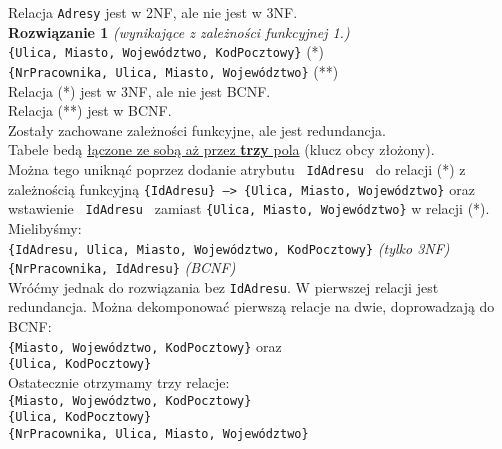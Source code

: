Relacja \texttt{Adresy} jest w 2NF, ale nie jest w 3NF.\\

\textbf{Rozwiązanie 1} \textit{(wynikające z zależności funkcyjnej 1.)}\\

\texttt{\{{\color{green}\faKey}{\color{blue}\faKey}Ulica,
{\color{green}\faKey}Miasto, {\color{green}\faKey}Województwo,
{\color{blue}\faKey}KodPocztowy\}} (*)\\
\texttt{\{{\color{green}\faKey}NrPracownika, Ulica, Miasto, Województwo\}}
(**)\\

Relacja (*) jest w 3NF, ale nie jest BCNF.\\
Relacja (**) jest w BCNF.\\

Zostały zachowane zależności funkcyjne, ale jest redundancja.\\
Tabele bedą \underline{łączone ze sobą aż przez \textbf{trzy} pola}
(klucz obcy złożony).\\
Można tego uniknąć poprzez dodanie atrybutu \texttt{ IdAdresu } do
relacji (*) z zależnością funkcyjną \texttt{\{IdAdresu\} --> \{Ulica,
Miasto, Województwo\}} oraz wstawienie \texttt{ IdAdresu } zamiast
\texttt{\{Ulica, Miasto, Województwo\}} w relacji (*). Mielibyśmy:\\

\texttt{\{{\color{red}\faKey}IdAdresu,
{\color{green}\faKey}{\color{blue}\faKey}Ulica,
{\color{green}\faKey}Miasto, {\color{green}\faKey}Województwo,
{\color{green}\faKey}KodPocztowy\}}
\textit{(tylko 3NF)}\\
\texttt{\{{\color{green}\faKey}NrPracownika, IdAdresu\}} \textit{(BCNF)}\\

Wróćmy jednak do rozwiązania bez \texttt{IdAdresu}. W pierwszej relacji jest
redundancja. Można dekomponować pierwszą relacje na dwie, doprowadzają do
BCNF:\\
\texttt{\{Miasto, Województwo, {\color{blue}\faKey}KodPocztowy\}} oraz\\
\texttt{\{{\color{green}\faKey}Ulica, {\color{green}\faKey}KodPocztowy\}}\\

Ostatecznie otrzymamy trzy relacje:\\
\texttt{\{Miasto, Województwo, {\color{blue}\faKey}KodPocztowy\}}\\
\texttt{\{{\color{green}\faKey}Ulica, {\color{green}\faKey}KodPocztowy\}}\\
\texttt{\{{\color{green}\faKey}NrPracownika, Ulica, Miasto, Województwo\}}\\

